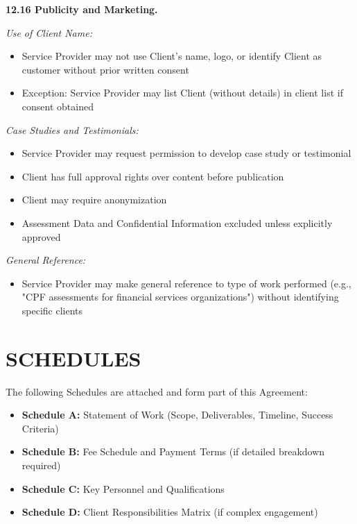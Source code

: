 \documentclass[11pt,a4paper]{article}
\begin{document}
\textbf{12.16 Publicity and Marketing.}

\textit{Use of Client Name:}
\begin{itemize}
\item Service Provider may not use Client's name, logo, or identify Client as customer without prior written consent
\item Exception: Service Provider may list Client (without details) in client list if consent obtained
\end{itemize}

\textit{Case Studies and Testimonials:}
\begin{itemize}
\item Service Provider may request permission to develop case study or testimonial
\item Client has full approval rights over content before publication
\item Client may require anonymization
\item Assessment Data and Confidential Information excluded unless explicitly approved
\end{itemize}

\textit{General Reference:}
\begin{itemize}
\item Service Provider may make general reference to type of work performed (e.g., "CPF assessments for financial services organizations") without identifying specific clients
\end{itemize}

\section*{SCHEDULES}

The following Schedules are attached and form part of this Agreement:

\begin{itemize}
\item \textbf{Schedule A:} Statement of Work (Scope, Deliverables, Timeline, Success Criteria)
\item \textbf{Schedule B:} Fee Schedule and Payment Terms (if detailed breakdown required)
\item \textbf{Schedule C:} Key Personnel and Qualifications
\item \textbf{Schedule D:} Client Responsibilities Matrix (if complex engagement)
\end{itemize}

\vspace{2em}
\end{document}
